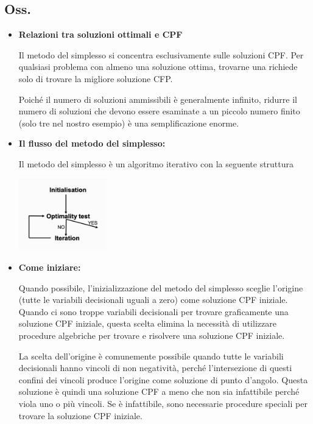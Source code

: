\documentclass[a4paper, 11pt]{article}
\begin{document}
        \subsection{Oss.}
        \begin{itemize}
            \item \textbf{Relazioni tra soluzioni ottimali e CPF}
            
                Il metodo del simplesso si concentra esclusivamente sulle soluzioni CPF. Per qualsiasi problema con almeno una soluzione ottima, trovarne una richiede solo di trovare la migliore soluzione CFP.
            
                Poiché il numero di soluzioni ammissibili è generalmente infinito, ridurre il numero di soluzioni che devono essere esaminate a un piccolo numero finito (solo tre nel nostro esempio) è una semplificazione enorme.

            \item \textbf{Il flusso del metodo del simplesso:}

                Il metodo del simplesso è un algoritmo iterativo con la seguente struttura
            

                \begin{center}
                    \includegraphics[width=0.3\textwidth]{graph1.png}
                \end{center} 
            
            \item \textbf{Come iniziare:}
            
                Quando possibile, l'inizializzazione del metodo del simplesso sceglie l'origine (tutte le variabili decisionali uguali a zero) come soluzione CPF iniziale. Quando ci sono troppe variabili decisionali per trovare graficamente una soluzione CPF iniziale, questa scelta elimina la necessità di utilizzare procedure algebriche per trovare e risolvere una soluzione CPF iniziale.
                
                La scelta dell'origine è comunemente possibile quando tutte le variabili decisionali hanno vincoli di non negatività, perché l'intersezione di questi confini dei vincoli produce l'origine come soluzione di punto d'angolo. Questa soluzione è quindi una soluzione CPF a meno che non sia infattibile perché viola uno o più vincoli. Se è infattibile, sono necessarie procedure speciali per trovare la soluzione CPF iniziale.
                


\end{itemize}
\end{document}
